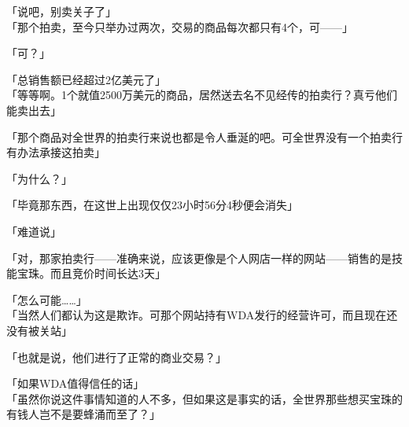 「说吧，别卖关子了」\\

「那个拍卖，至今只举办过两次，交易的商品每次都只有4个，可——」

「可？」

「总销售额已经超过2亿美元了」\\

「等等啊。1个就值2500万美元的商品，居然送去名不见经传的拍卖行？真亏他们能卖出去」

「那个商品对全世界的拍卖行来说也都是令人垂涎的吧。可全世界没有一个拍卖行有办法承接这拍卖」

「为什么？」

「毕竟那东西，在这世上出现仅仅23小时56分4秒便会消失」

「难道说」

「对，那家拍卖行——准确来说，应该更像是个人网店一样的网站——销售的是技能宝珠。而且竞价时间长达3天」

「怎么可能……」\\

「当然人们都认为这是欺诈。可那个网站持有WDA发行的经营许可，而且现在还没有被关站」

「也就是说，他们进行了正常的商业交易？」

「如果WDA值得信任的话」\\

「虽然你说这件事情知道的人不多，但如果这是事实的话，全世界那些想买宝珠的有钱人岂不是要蜂涌而至了？」


